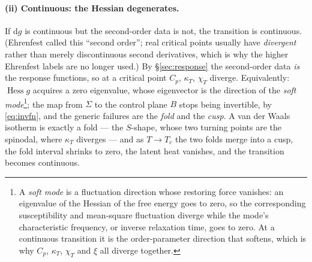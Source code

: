 \documentclass[10pt,a4paper]{article}
\newcommand{\dd}{\mathrm{d}}
\DeclareMathOperator{\Hess}{Hess}
\theoremstyle{plain}
\theoremstyle{definition}
\numberwithin{equation}{section}
\begin{document}
\paragraph{(ii) Continuous: the Hessian degenerates.} If $\dd g$ is continuous but the
second-order data is not, the transition is continuous. (Ehrenfest called this ``second
order''; real critical points usually have \emph{divergent} rather than merely discontinuous
second derivatives, which is why the higher Ehrenfest labels are no longer used.) By
\S\ref{sec:response} the second-order data \emph{is} the response functions, so at a critical
point $C_p$, $\kappa_T$, $\chi_T$ diverge. Equivalently: $\Hess g$ acquires a zero eigenvalue,
whose eigenvector is the direction of the \emph{soft mode}\footnote{A \emph{soft mode} is a
fluctuation direction whose restoring force vanishes: an eigenvalue of the Hessian of the free
energy goes to zero, so the corresponding susceptibility and mean-square fluctuation diverge
while the mode's characteristic frequency, or inverse relaxation time, goes to zero. At a
continuous transition it is the order-parameter direction that softens, which is why $C_p$,
$\kappa_T$, $\chi_T$ and $\xi$ all diverge together.}; the map from $\Sigma$ to the control plane
$B$ stops being invertible, by \eqref{eq:invfn}, and the generic failures are the \emph{fold}
and the \emph{cusp}. A van der Waals isotherm is exactly a fold --- the $S$-shape, whose two
turning points are the spinodal, where $\kappa_T$ diverges --- and as $T\to T_c$ the two folds
merge into a cusp, the fold interval shrinks to zero, the latent heat vanishes, and the
transition becomes continuous.
\end{document}
